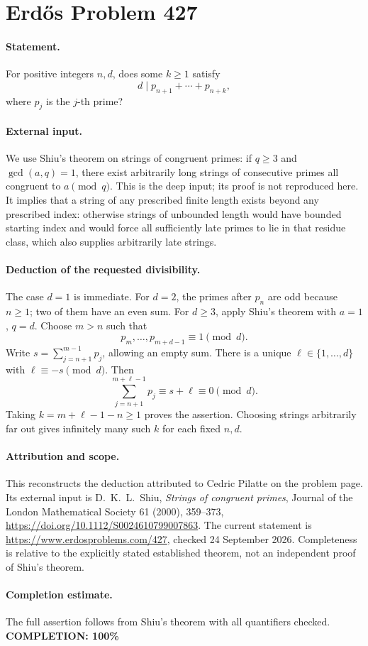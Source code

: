 \section*{Erd\H{o}s Problem 427}

\paragraph{Statement.}
For positive integers \(n,d\), does some \(k\geq1\) satisfy
\[
 d\mid p_{n+1}+\cdots+p_{n+k},
\]
where \(p_j\) is the \(j\)-th prime?

\paragraph{External input.}
We use Shiu's theorem on strings of congruent primes: if \(q\geq3\)
and \(\gcd(a,q)=1\), there exist arbitrarily long strings of consecutive
primes all congruent to \(a\pmod q\).
This is the deep input; its proof is not reproduced here.
It implies that a string of any prescribed finite length exists beyond
any prescribed index: otherwise strings of unbounded length would have
bounded starting index and would force all sufficiently late primes to
lie in that residue class, which also supplies arbitrarily late strings.

\paragraph{Deduction of the requested divisibility.}
The case \(d=1\) is immediate. For \(d=2\), the primes after \(p_n\)
are odd because \(n\geq1\); two of them have an even sum.
For \(d\geq3\), apply Shiu's theorem with \(a=1\), \(q=d\).
Choose \(m>n\) such that
\[
 p_m,\ldots,p_{m+d-1}\equiv1\pmod d.
\]
Write \(s=\sum_{j=n+1}^{m-1}p_j\), allowing an empty sum. There is a
unique \(\ell\in\{1,\ldots,d\}\) with \(\ell\equiv-s\pmod d\).
Then
\[
 \sum_{j=n+1}^{m+\ell-1}p_j
 \equiv s+\ell\equiv0\pmod d.
\]
Taking \(k=m+\ell-1-n\geq1\) proves the assertion. Choosing strings
arbitrarily far out gives infinitely many such \(k\) for each fixed
\(n,d\).

\paragraph{Attribution and scope.}
This reconstructs the deduction attributed to Cedric Pilatte on the
problem page. Its external input is
D.~K.~L.~Shiu, \emph{Strings of congruent primes},
Journal of the London Mathematical Society 61 (2000), 359--373,
\url{https://doi.org/10.1112/S0024610799007863}.
The current statement is \url{https://www.erdosproblems.com/427},
checked 24 September 2026. Completeness is relative to the explicitly
stated established theorem, not an independent proof of Shiu's theorem.

\paragraph{Completion estimate.}
The full assertion follows from Shiu's theorem with all quantifiers checked.
\textbf{COMPLETION: 100\%}
